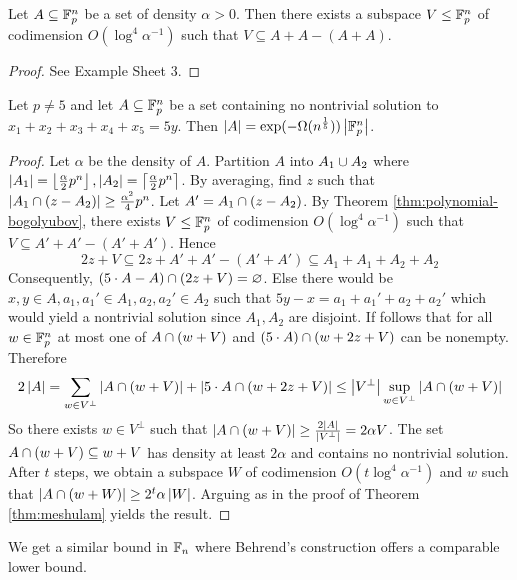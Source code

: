 \documentclass{article}
\begin{document}
\begin{thm}\label{thm:polynomial-bogolyubov}
  Let $A \subseteq \mathbb F_p^n$ be a set of density $\alpha > 0$. Then there exists a subspace $V \le \mathbb F_p^n$ of codimension $O(\log^4\alpha^{-1})$ such that $V \subseteq A + A - (A + A)$.
\end{thm}
\begin{proof}
  See Example Sheet 3.
\end{proof}

\begin{thm}
  Let $p \ne 5$ and let $A \subseteq \mathbb F_p^n$ be a set containing no nontrivial solution to $x_1 + x_2 + x_3 + x_4 + x_5 = 5y$. Then $\left\lvert A\right\rvert = \exp(-\Omega(n^{\frac 15}))\left\lvert \mathbb F_p^n\right\rvert$.
\end{thm}
\begin{proof}
  Let $\alpha$ be the density of $A$. Partition $A$ into $A_1 \cup A_2$ where $\left\lvert A_1\right\rvert = \left\lfloor \frac\alpha 2 p^n\right\rfloor, \left\lvert A_2\right\rvert = \left\lceil \frac\alpha 2 p^n\right\rceil$. By averaging, find $z$ such that $\left\lvert A_1 \cap (z - A_2)\right\rvert \ge \frac{\alpha^2}4 p^n$. Let $A' = A_1 \cap (z - A_2)$. By Theorem \ref{thm:polynomial-bogolyubov}, there exists $V \le \mathbb F_p^n$ of codimension $O(\log^4\alpha^{-1})$ such that $V \subseteq A' + A' - (A' + A')$. Hence
  $$2z + V \subseteq 2z + A' + A' - (A' + A') \subseteq A_1 + A_1 + A_2 + A_2$$
  Consequently, $(5 \cdot A - A) \cap (2z + V) = \varnothing$. Else there would be $x, y \in A, a_1, a_1' \in A_1, a_2, a_2' \in A_2$ such that $5y - x = a_1 + a_1' + a_2 + a_2'$ which would yield a nontrivial solution since $A_1, A_2$ are disjoint. If follows that for all $w \in \mathbb F_p^n$ at most one of $A \cap (w + V)$ and $(5 \cdot A) \cap (w + 2z + V)$ can be nonempty. Therefore
  $$2\left\lvert A\right\rvert = \sum_{w \in V^\perp} \left\lvert A \cap (w + V)\right\rvert + \left\lvert 5 \cdot A \cap (w + 2z + V)\right\rvert \le \left\lvert V^\perp\right\rvert \sup_{w \in V^\perp} \left\lvert A \cap (w + V)\right\rvert$$
  So there exists $w \in V^\perp$ such that $\left\lvert A \cap (w + V)\right\rvert \ge \frac{2\left\lvert A\right\rvert}{\left\lvert V^\perp\right\rvert} = 2\alpha V$. The set $A \cap (w + V) \subseteq w + V$ has density at least $2\alpha$ and contains no nontrivial solution. \\
  After $t$ steps, we obtain a subspace $W$ of codimension $O(t\log^4\alpha^{-1})$ and $w$ such that $\left\lvert A \cap (w + W)\right\rvert \ge 2^t\alpha \left\lvert W\right\rvert$. Arguing as in the proof of Theorem \ref{thm:meshulam} yields the result.
\end{proof}

We get a similar bound in $\mathbb F_n$ where Behrend's construction offers a comparable lower bound.
\end{document}
